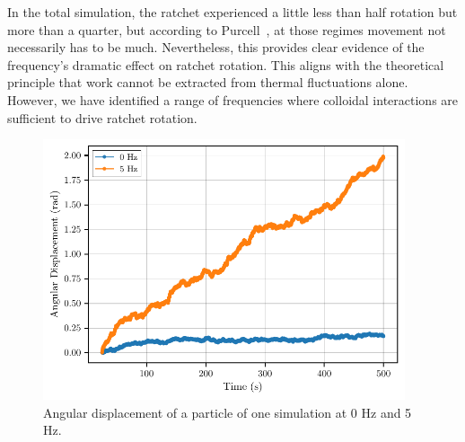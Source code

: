 In the total simulation, the ratchet experienced a little less than half rotation but more than a quarter, but according to Purcell~\cite{purcell2014life}, at those regimes movement not necessarily has to be much. Nevertheless, this provides clear evidence of the frequency's dramatic effect on ratchet rotation. This aligns with the theoretical principle that work cannot be extracted from thermal fluctuations alone. However, we have identified a range of frequencies where colloidal interactions are sufficient to drive ratchet rotation.


\begin{figure}
  \begin{center}
    \includegraphics[width=0.95\textwidth]{figures/particle_displacement.pdf}
  \end{center}
  \caption[Angular displacement of a particle.]{Angular displacement of a particle of one simulation at 0 Hz and 5 Hz.}\label{fig:particleangulardisplacement}
\end{figure}

